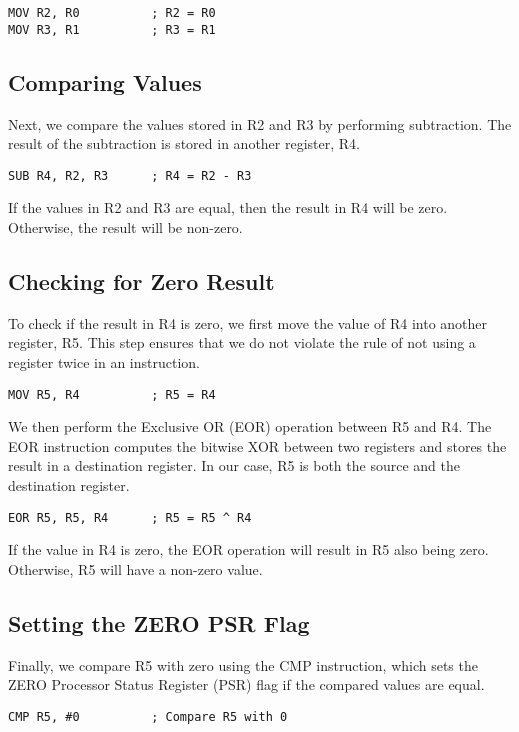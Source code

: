 \begin{verbatim}
MOV R2, R0          ; R2 = R0
MOV R3, R1          ; R3 = R1
\end{verbatim}

\subsection{Comparing Values}
Next, we compare the values stored in R2 and R3 by performing subtraction. The result of the subtraction is stored in another register, R4.

\begin{verbatim}
SUB R4, R2, R3      ; R4 = R2 - R3
\end{verbatim}

If the values in R2 and R3 are equal, then the result in R4 will be zero. Otherwise, the result will be non-zero.

\subsection{Checking for Zero Result}
To check if the result in R4 is zero, we first move the value of R4 into another register, R5. This step ensures that we do not violate the rule of not using a register twice in an instruction.

\begin{verbatim}
MOV R5, R4          ; R5 = R4
\end{verbatim}

We then perform the Exclusive OR (EOR) operation between R5 and R4. The EOR instruction computes the bitwise XOR between two registers and stores the result in a destination register. In our case, R5 is both the source and the destination register.

\begin{verbatim}
EOR R5, R5, R4      ; R5 = R5 ^ R4
\end{verbatim}

If the value in R4 is zero, the EOR operation will result in R5 also being zero. Otherwise, R5 will have a non-zero value.

\subsection{Setting the ZERO PSR Flag}
Finally, we compare R5 with zero using the CMP instruction, which sets the ZERO Processor Status Register (PSR) flag if the compared values are equal.

\begin{verbatim}
CMP R5, #0          ; Compare R5 with 0
\end{verbatim}

